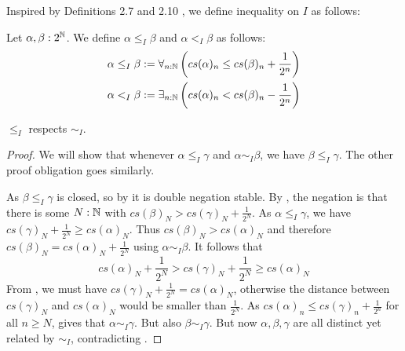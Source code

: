 Inspired by Definitions 2.7 and 2.10 \Cite{Bishop}, 
we define inequality on $I$ as follows:
\begin{definition}
  Let $\alpha,\beta:2^{\mathbb{N}}$. 
  We define $\alpha\leq_I \beta$ and $\alpha<_I\beta$ as follows:
  \begin{align}
  \alpha\leq_I\beta : = \forall_{n:\mathbb{N}} \left( cs(\alpha)_n \leq cs(\beta)_n + \frac {1} {2^n}\right)\\ 
    \alpha   <_I \beta : = \exists_{n:\mathbb{N}} \left( cs(\alpha)_n < cs(\beta)_n - \frac {1} {2^n}\right)
\end{align}
\end{definition}
\begin{lemma}
  $\leq_I$ respects $\sim_I$. 
\end{lemma}
\begin{proof}
  We will show that whenever $\alpha\leq_I \gamma$ and $\alpha\sim_I\beta$, we have $\beta\leq_I\gamma$. 
  The other proof obligation goes similarly. 


  As $\beta\leq_I\gamma$ is closed, so by  it is double negation stable. 
  By , the negation is that there is some 
  $N:\mathbb{N}$ with 
  $cs(\beta)_N > cs(\gamma)_N + \frac{1}{2^N}.$
  As $\alpha\leq_I\gamma$, we have 
  $cs(\gamma)_N + \frac{1}{2^N}\geq cs(\alpha)_N $. 
  Thus $cs(\beta)_N > cs(\alpha)_N$ and therefore $cs(\beta)_N = cs(\alpha)_N+\frac{1}{2^N}$ using  $\alpha\sim_I\beta$.
  It follows that 
  $$
  cs(\alpha)_N+\frac{1}{2^N} > cs(\gamma)_N + \frac{1}{2^N} \geq cs(\alpha)_N
  $$
  From , we must have
  $cs(\gamma)_N  + \frac{1}{2^N} = cs(\alpha)_N$, otherwise the distance 
  between $cs(\gamma)_N$ and $cs(\alpha)_N$ 
  would be smaller than $\frac{1}{2^N}$.
  As $cs(\alpha)_n \leq cs(\gamma)_n + \frac{1}{2^n}$ for all $n\geq N$, 
   gives that 
  $\alpha\sim_I\gamma$. But also $\beta\sim_I\gamma$. 
  But now $\alpha,\beta,\gamma$ are all distinct yet related by $\sim_I$, contradicting 
  . 
\end{proof}

